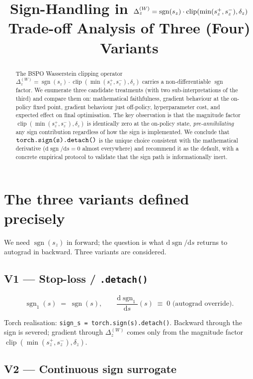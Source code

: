 \documentclass[11pt]{article}
\title{Sign-Handling in $\Delta_z^{(W)} = \sign(s_z)\cdot\clip(\min(s_z^+,s_z^-),\delta_z)$ \\
\large Trade-off Analysis of Three (Four) Variants}
\author{}
\date{}
\DeclareMathOperator*{\clip}{clip}
\DeclareMathOperator{\sign}{sgn}
\newcommand{\dif}{\mathrm{d}}
\begin{document}
\maketitle

\begin{abstract}
The BSPO Wasserstein clipping operator
$\Delta_z^{(W)} = \sign(s_z)\cdot\clip(\min(s_z^+,s_z^-),\delta_z)$ carries
a non-differentiable $\sign$ factor. We enumerate three candidate
treatments (with two sub-interpretations of the third) and compare them
on: mathematical faithfulness, gradient behaviour at the on-policy fixed
point, gradient behaviour just off-policy, hyperparameter cost, and
expected effect on final optimisation. The key observation is that the
magnitude factor $\clip(\min(s_z^+,s_z^-),\delta_z)$ is identically zero
at the on-policy state, \emph{pre-annihilating} any sign contribution
regardless of how the sign is implemented. We conclude that
$\verb|torch.sign(s).detach()|$ is the unique choice consistent with the
mathematical derivative ($\dif\sign/\dif s = 0$ almost everywhere) and
recommend it as the default, with a concrete empirical protocol to
validate that the sign path is informationally inert.
\end{abstract}

\section{The three variants defined precisely}
\label{sec:variants}

We need $\sign(s_z)$ in forward; the question is what
$\dif\sign/\dif s$ returns to autograd in backward. Three variants are
considered.

\subsection*{V1 --- Stop-loss / \texttt{.detach()}}

\[
\sign_1(s) \;=\; \sign(s),\qquad
\frac{\dif\sign_1}{\dif s}(s) \;\equiv\; 0 \text{ (autograd override)}.
\]

Torch realisation: \verb|sign_s = torch.sign(s).detach()|.
Backward through the sign is severed; gradient through
$\Delta_z^{(W)}$ comes only from the magnitude factor
$\clip(\min(s_z^+, s_z^-), \delta_z)$.

\subsection*{V2 --- Continuous sign surrogate}
\end{document}
